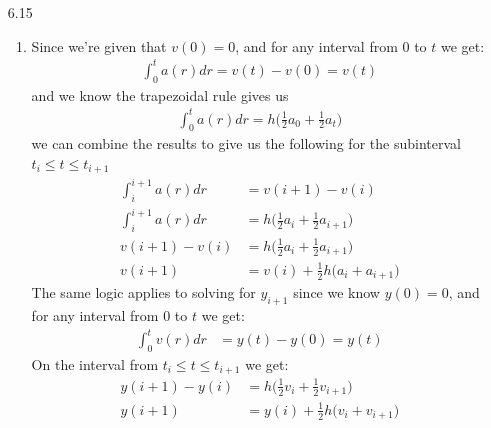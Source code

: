 \documentclass[11pt,a4paper]{article}
\begin{document}
\begin{itemize}
\begin{enumerate} [label={\alph*)}]
\begin{center}
					\end{center}
					Taking the norm of $\vert \vert f'''' \vert \vert_\infty$ to be $12$ (solved using MATLAB), we solve for $h$:
					\begin{align*}
					\frac{2}{90}h^4 (12) &\leq 10^{-6} \\
					h &\leq \sqrt[4]{\frac{10^{-6}}{12}*\frac{90}{2}} \\
					h &\leq 4.4005587e-02
					\end{align*}
					\item Using the same code from part B adapted for Simpson's rule...
				\end{enumerate}
				
			\item[6.15]
				\begin{enumerate} [label={\alph*)}]
					\item Since we're given that $v(0) = 0$, and for any interval from $0$ to $t$ we get:
					\begin{align*}
					\int_{0}^{t} a(r)dr = v(t) - v(0) = v(t)
					\end{align*}
					and we know the trapezoidal rule gives us
					\begin{align*}
					\int_{0}^{t} a(r)dr = h\Big(\frac{1}{2}a_0 + \frac{1}{2}a_{t}\Big)
					\end{align*}
					we can combine the results to give us the following for the subinterval $t_i\leq t \leq t_{i+1}$
					\begin{align*}
					\int_{i}^{i+1} a(r)dr &= v(i+1) - v(i)\\
					\int_{i}^{i+1} a(r)dr &= h\Big(\frac{1}{2}a_i + \frac{1}{2}a_{i+1}\Big) \\
					v(i+1) - v(i) &= h\Big(\frac{1}{2}a_i + \frac{1}{2}a_{i+1}\Big)\\
					v(i+1) &= v(i) + \frac{1}{2}h\Big(a_i + a_{i+1}\Big)
					\end{align*}
					The same logic applies to solving for $y_{i+1}$ since we know $y(0) = 0$, and for any interval from $0$ to $t$ we get:
					\begin{align*}
					\int_{0}^{t} v(r)dr &= y(t) - y(0) = y(t)
					\end{align*}
					On the interval from $t_i\leq t \leq t_{i+1}$ we get:
					\begin{align*}
					y(i+1) - y(i) &= h\Big(\frac{1}{2}v_i + \frac{1}{2}v_{i+1}\Big)\\
					y(i+1) &= y(i) + \frac{1}{2}h\Big(v_i + v_{i+1}\Big)
					\end{align*}

\end{enumerate}
\end{itemize}
\end{document}
